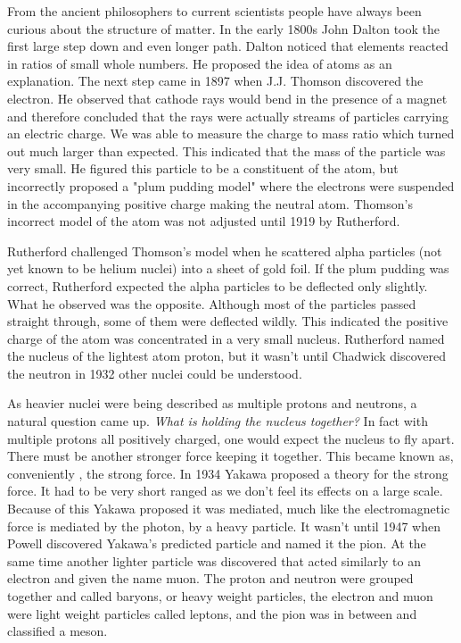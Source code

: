 \documentclass[abstract = on,listof=totoc, bibliography=totoc]{scrreprt}
\begin{document}
From the ancient philosophers to current scientists people have always been curious about the structure of matter. In the early 1800s John Dalton took the first large step down and even longer path. Dalton noticed that elements reacted in ratios of small whole numbers. He proposed the idea of atoms as an explanation. The next step came in 1897 when J.J. Thomson discovered the electron. He observed that cathode rays would bend in the presence of a magnet and therefore concluded that the rays were actually streams of particles carrying an electric charge. We was able to measure the charge to mass ratio which turned out much larger than expected. This indicated that the mass of the particle was very small. He figured this particle to be a constituent of the atom, but incorrectly proposed a "plum pudding model" where the electrons were suspended in the accompanying positive charge making the neutral atom. Thomson's incorrect model of the atom was not adjusted until 1919 by Rutherford.

Rutherford challenged Thomson's model when he scattered alpha particles (not yet known to be helium nuclei) into a sheet of gold foil. If the plum pudding was correct, Rutherford expected the alpha particles to be deflected only slightly. What he observed was the opposite. Although most of the particles passed straight through, some of them were deflected wildly. This indicated the positive charge of the atom was concentrated in a very small nucleus. Rutherford named the nucleus of the lightest atom proton, but it wasn't until Chadwick discovered the neutron in 1932 other nuclei could be understood.\cite{IEP}

As heavier nuclei were being described as multiple protons and neutrons, a natural question came up. \textit{What is holding the nucleus together?} In fact with multiple protons all positively charged, one would expect the nucleus to fly apart. There must be another stronger force keeping it together. This became known as, conveniently , the strong force. In 1934 Yakawa proposed a theory for the strong force. It had to be very short ranged as we don't feel its effects on a large scale. Because of this Yakawa proposed it was mediated, much like the electromagnetic force is mediated by the photon, by a heavy particle.  It wasn't until 1947 when Powell discovered Yakawa's predicted particle and named it the pion. At the same time another lighter particle was discovered that acted similarly to an electron and given the name muon. The proton and neutron were grouped together and called baryons, or heavy weight particles, the electron and muon were light weight particles called leptons, and the pion was in between and classified a meson.\cite{IEP}  
\end{document}

